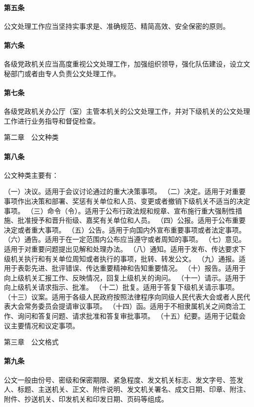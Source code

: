 \documentclass{gbt9704}
\begin{document}
\paragraph{第五条}
公文处理工作应当坚持实事求是、准确规范、精简高效、安全保密的原则。

\paragraph{第六条}
各级党政机关应当高度重视公文处理工作，加强组织领导，强化队伍建设，设立文秘部门或者由专人负责公文处理工作。

\paragraph{第七条}
各级党政机关办公厅（室）主管本机关的公文处理工作，并对下级机关的公文处理工作进行业务指导和督促检查。


第二章　公文种类


\paragraph{第八条}
公文种类主要有：

（一）决议。适用于会议讨论通过的重大决策事项。
（二）决定。适用于对重要事项作出决策和部署、奖惩有关单位和人员、变更或者撤销下级机关不适当的决定事项。
（三）命令（令）。适用于公布行政法规和规章、宣布施行重大强制性措施、批准授予和晋升衔级、嘉奖有关单位和人员。
（四）公报。适用于公布重要决定或者重大事项。
（五）公告。适用于向国内外宣布重要事项或者法定事项。
（六）通告。适用于在一定范围内公布应当遵守或者周知的事项。
（七）意见。适用于对重要问题提出见解和处理办法。
（八）通知。适用于发布、传达要求下级机关执行和有关单位周知或者执行的事项，批转、转发公文。
（九）通报。适用于表彰先进、批评错误、传达重要精神和告知重要情况。
（十）报告。适用于向上级机关汇报工作、反映情况，回复上级机关的询问。
（十一）请示。适用于向上级机关请求指示、批准。
（十二）批复。适用于答复下级机关请示事项。
（十三）议案。适用于各级人民政府按照法律程序向同级人民代表大会或者人民代表大会常务委员会提请审议事项。
（十四）函。适用于不相隶属机关之间商洽工作、询问和答复问题、请求批准和答复审批事项。
（十五）纪要。适用于记载会议主要情况和议定事项。

第三章　公文格式


\paragraph{第九条}
公文一般由份号、密级和保密期限、紧急程度、发文机关标志、发文字号、签发人、标题、主送机关、正文、附件说明、发文机关署名、成文日期、印章、附注、附件、抄送机关、印发机关和印发日期、页码等组成。
\end{document}
